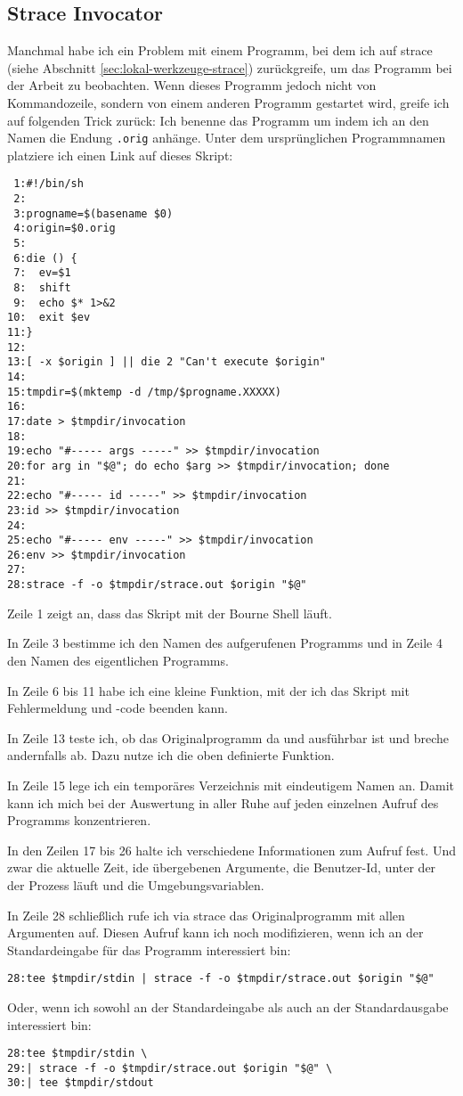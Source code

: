 \begin{normaltext}
  \subsection*{Strace Invocator}
  Manchmal habe ich ein Problem mit einem Programm, bei dem ich auf strace
  (siehe Abschnitt \ref{sec:lokal-werkzeuge-strace}) zurückgreife,
  um das Programm bei der Arbeit zu beobachten.
  Wenn dieses Programm jedoch nicht von Kommandozeile,
  sondern von einem anderen Programm gestartet wird, greife ich auf folgenden
  Trick zurück: Ich benenne das Programm um indem ich an den Namen die Endung
  \verb?.orig? anhänge. Unter dem ursprünglichen Programmnamen platziere ich
  einen Link auf dieses Skript:
  \begin{verbatim}
 1:#!/bin/sh
 2:
 3:progname=$(basename $0)
 4:origin=$0.orig
 5:
 6:die () {
 7:  ev=$1
 8:  shift
 9:  echo $* 1>&2
10:  exit $ev
11:}
12:
13:[ -x $origin ] || die 2 "Can't execute $origin"
14:
15:tmpdir=$(mktemp -d /tmp/$progname.XXXXX)
16:
17:date > $tmpdir/invocation
18:
19:echo "#----- args -----" >> $tmpdir/invocation
20:for arg in "$@"; do echo $arg >> $tmpdir/invocation; done
21:
22:echo "#----- id -----" >> $tmpdir/invocation
23:id >> $tmpdir/invocation
24:
25:echo "#----- env -----" >> $tmpdir/invocation
26:env >> $tmpdir/invocation
27:
28:strace -f -o $tmpdir/strace.out $origin "$@"
  \end{verbatim}
  Zeile 1 zeigt an, dass das Skript mit der Bourne Shell läuft.

  In Zeile 3 bestimme ich den Namen des aufgerufenen Programms und in Zeile 4
  den Namen des eigentlichen Programms.

  In Zeile 6 bis 11 habe ich eine kleine Funktion, mit der ich das Skript mit
  Fehlermeldung und -code beenden kann.

  In Zeile 13 teste ich, ob das Originalprogramm da und ausführbar ist und
  breche andernfalls ab. Dazu nutze ich die oben definierte Funktion.

  In Zeile 15 lege ich ein temporäres Verzeichnis mit eindeutigem Namen an.
  Damit kann ich mich bei der Auswertung in aller Ruhe auf jeden einzelnen
  Aufruf des Programms konzentrieren.

  In den Zeilen 17 bis 26 halte ich verschiedene Informationen zum Aufruf
  fest. Und zwar die aktuelle Zeit, ide übergebenen Argumente, die
  Benutzer-Id, unter der der Prozess läuft und die Umgebungsvariablen.

  In Zeile 28 schließlich rufe ich via strace das Originalprogramm mit allen
  Argumenten auf. Diesen Aufruf kann ich noch modifizieren, wenn ich an der
  Standardeingabe für das Programm interessiert bin:
  \begin{verbatim}
28:tee $tmpdir/stdin | strace -f -o $tmpdir/strace.out $origin "$@"
  \end{verbatim}
  Oder, wenn ich sowohl an der Standardeingabe als auch an der Standardausgabe
  interessiert bin:
  \begin{verbatim}
28:tee $tmpdir/stdin \
29:| strace -f -o $tmpdir/strace.out $origin "$@" \
30:| tee $tmpdir/stdout
  \end{verbatim}
\end{normaltext}

